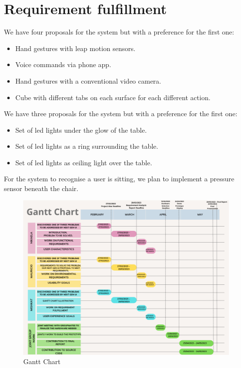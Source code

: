 \documentclass{article}
\begin{document}
\section{Requirement fulfillment}
We have four proposals for the system but with a preference for the first one:
\begin{itemize}
    \item Hand gestures with leap motion sensors.
    \item Voice commands via phone app.
    \item Hand gestures with a conventional video camera.
    \item Cube with different tabs on each surface for each different action.
\end{itemize}
We have three proposals for the system but with a preference for the first one:
\begin{itemize}
    \item Set of led lights under the glow of the table.
    \item Set of led lights as a ring surrounding the table.
    \item Set of led lights as ceiling light over the table.
\end{itemize}
For the system to recognise a user is sitting, we plan to implement a pressure sensor beneath the chair.


\begin{figure}[!htb]
\centering
\includegraphics[width=\linewidth]{GanttChart.png}
\caption{Gantt Chart}
\label{}
\end{figure}



\end{document}

